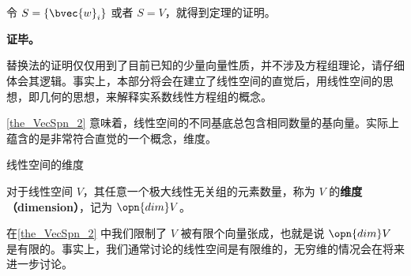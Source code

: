 令 $S=\{\bvec{w}_i\}$ 或者 $S=V$，就得到定理的证明。

\textbf{证毕。}

替换法的证明仅仅用到了目前已知的少量向量性质，并不涉及方程组理论，请仔细体会其逻辑。事实上，本部分将会在建立了线性空间的直觉后，用线性空间的思想，即几何的思想，来解释实系数线性方程组的概念。

\autoref{the_VecSpn_2} 意味着，线性空间的不同基底总包含相同数量的基向量。实际上蕴含的是非常符合直觉的一个概念，维度。

\begin{definition}{线性空间的维度}

对于线性空间 $V$，其任意一个极大线性无关组的元素数量，称为 $V$ 的\textbf{维度（dimension）}，记为 $\opn{dim}V$。

\end{definition}

在\autoref{the_VecSpn_2} 中我们限制了 $V$ 被有限个向量张成，也就是说 $\opn{dim}V$ 是有限的。事实上，我们通常讨论的线性空间是有限维的，无穷维的情况会在将来进一步讨论。



